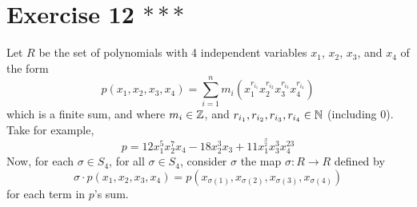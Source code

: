 \documentclass[12pt]{article}
\begin{document}
    \section*{Exercise 12 $***$}
    Let $R$ be the set of polynomials with 4 independent variables 
    $x_1$, $x_2$, $x_3$, and $x_4$ of the form
    \[ p(x_1, x_2, x_3, x_4) = \sum_{i = 1}^{n}
    m_i(x_1^{r_{i_1}}x_2^{r_{i_2}}x_3^{r_{i_3}}x_4^{r_{i_4}}) \]
    which is a finite sum,
    and where $m_i \in \mathbb{Z}$,
    and $r_{i_1}, r_{i_2}, r_{i_3}, r_{i_4} \in \mathbb{N}$ (including 0).
    Take for example,
    \[ p = 12x_1^5x_2^7x_4 - 18x_2^3x_3 + 11x_1^^x_2x_3^3x_4^{23} \]
    Now, for each $\sigma \in S_4$,
    for all $\sigma \in S_4$,
    consider $\sigma$ the map $\sigma: R \to R$ defined by \\
    \[\sigma \cdot p(x_1, x_2, x_3, x_4)
    = p(x_{\sigma(1)}, x_{\sigma(2)}, x_{\sigma(3)}, x_{\sigma(4)})\]
    for each term in $p$'s sum.
\end{document}
